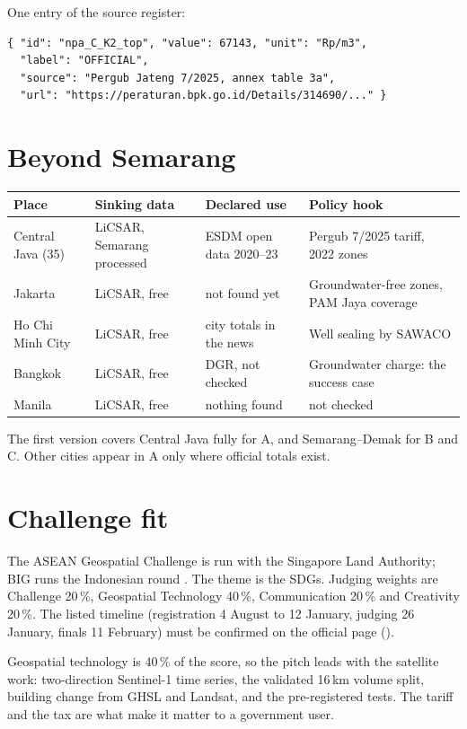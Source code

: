 One entry of the source register:
\begin{verbatim}
{ "id": "npa_C_K2_top", "value": 67143, "unit": "Rp/m3",
  "label": "OFFICIAL",
  "source": "Pergub Jateng 7/2025, annex table 3a",
  "url": "https://peraturan.bpk.go.id/Details/314690/..." }
\end{verbatim}

\section{Beyond Semarang}\label{sec:asean}

\begin{center}
\small
\begin{tabularx}{\linewidth}{@{}L{30mm}L{30mm}L{34mm}Y@{}}
\toprule
\textbf{Place} & \textbf{Sinking data} & \textbf{Declared use} & \textbf{Policy hook}\\
\midrule
Central Java (35) & LiCSAR, Semarang processed & ESDM open data 2020--23 & Pergub 7/2025 tariff, 2022 zones\\
Jakarta & LiCSAR, free & not found yet & Groundwater-free zones, PAM Jaya coverage\\
Ho Chi Minh City & LiCSAR, free & city totals in the news & Well sealing by SAWACO\\
Bangkok & LiCSAR, free & DGR, not checked & Groundwater charge: the success case\\
Manila & LiCSAR, free & nothing found & not checked\\
\bottomrule
\end{tabularx}
\end{center}

The first version covers Central Java fully for A, and Semarang--Demak for B and C. Other cities appear in A
only where official totals exist.

\section{Challenge fit}\label{sec:fit}

The ASEAN Geospatial Challenge is run with the Singapore Land Authority; BIG runs the Indonesian round
\cite{aseangeo,sla}. The theme is the SDGs. Judging weights are Challenge 20\,\%, Geospatial Technology
40\,\%, Communication 20\,\% and Creativity 20\,\%. The listed timeline (registration 4 August to 12
January, judging 26 January, finals 11 February) must be confirmed on the official page ().

Geospatial technology is 40\,\% of the score, so the pitch leads with the satellite work: two-direction
Sentinel-1 time series, the validated 16\,km volume split, building change from GHSL and Landsat, and the
pre-registered tests. The tariff and the tax are what make it matter to a government user.

